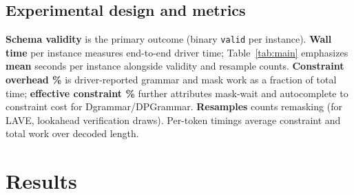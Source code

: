\subsection{Experimental design and metrics}
\textbf{Schema validity} is the primary outcome (binary \texttt{valid} per instance). \textbf{Wall time} per instance measures end-to-end driver time; Table~\ref{tab:main} emphasizes \textbf{mean} seconds per instance alongside validity and resample counts. \textbf{Constraint overhead \%} is driver-reported grammar and mask work as a fraction of total time; \textbf{effective constraint \%} further attributes mask-wait and autocomplete to constraint cost for Dgrammar/DPGrammar. \textbf{Resamples} counts remasking (for LAVE, lookahead verification draws). Per-token timings average constraint and total work over decoded length. %

\section{Results}
\label{sec:results}

